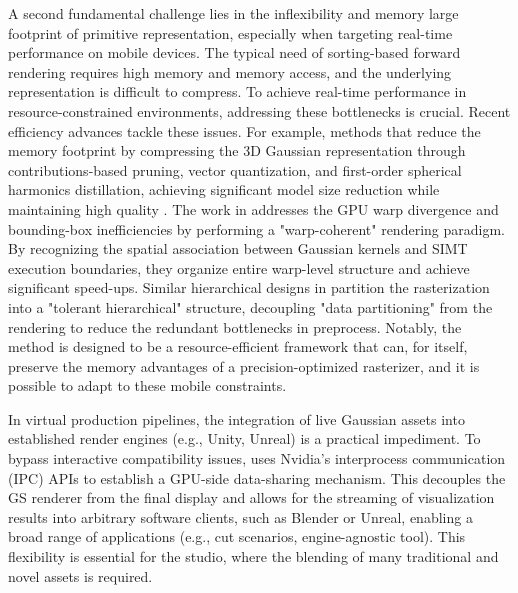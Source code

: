 \documentclass[11pt,a4paper]{article}
\begin{document}
A second fundamental challenge lies in the inflexibility and memory large footprint of primitive representation, especially when targeting real-time performance on mobile devices. The typical need of sorting-based forward rendering requires high memory and memory access, and the underlying representation is difficult to compress. To achieve real-time performance in resource-constrained environments, addressing these bottlenecks is crucial. Recent efficiency advances tackle these issues. For example, methods that reduce the memory footprint by compressing the 3D Gaussian representation through contributions-based pruning, vector quantization, and first-order spherical harmonics distillation, achieving significant model size reduction while maintaining high quality \cite{arxiv:2508.03017v2}. The work in \cite{arxiv:2606.16566v1} addresses the GPU warp divergence and bounding-box inefficiencies by performing a "warp-coherent" rendering paradigm. By recognizing the spatial association between Gaussian kernels and SIMT execution boundaries, they organize entire warp-level structure and achieve significant speed-ups. Similar hierarchical designs in \cite{arxiv:2606.00352v1} partition the rasterization into a "tolerant hierarchical" structure, decoupling "data partitioning" from the rendering to reduce the redundant bottlenecks in preprocess. Notably, the \cite{arxiv:2505.18764v2} method is designed to be a resource-efficient framework that can, for itself, preserve the memory advantages of a precision-optimized rasterizer, and it is possible to adapt to these mobile constraints.

In virtual production pipelines, the integration of live Gaussian assets into established render engines (e.g., Unity, Unreal) is a practical impediment. To bypass interactive compatibility issues, \cite{arxiv:2601.15431v1} uses Nvidia's interprocess communication (IPC) APIs to establish a GPU-side data-sharing mechanism. This decouples the GS renderer from the final display and allows for the streaming of visualization results into arbitrary software clients, such as Blender or Unreal, enabling a broad range of applications (e.g., cut scenarios, engine-agnostic tool). This flexibility is essential for the studio, where the blending of many traditional and novel assets is required.
\end{document}
